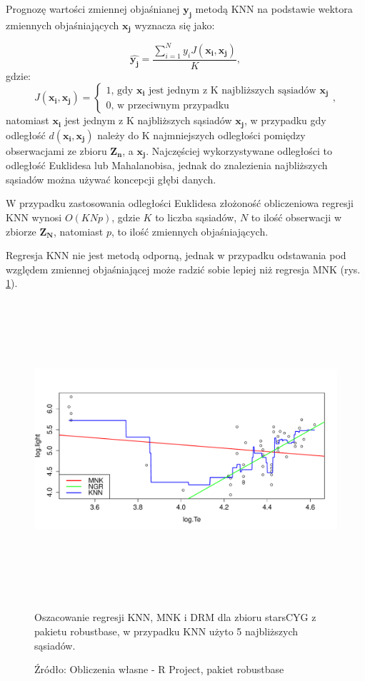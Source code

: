 \documentclass[man,mfu]{mgrwms}
\begin{document}
Prognozę wartości zmiennej objaśnianej $\mathbf{y_j}$ metodą KNN na podstawie wektora zmiennych objaśniających $\mathbf{x_j}$ wyznacza się jako:

\begin{equation}
\hat{\mathbf{y_j}} = \frac{\sum_{i=1}^N y_i J(\mathbf{x_i},\mathbf{x_j})}{K},
\end{equation}
gdzie:
\begin{equation}
J(\mathbf{x_i,x_j}) = \begin{cases} 1 \text{, gdy $\mathbf{x_i}$ jest jednym z K najbliższych sąsiadów $\mathbf{x_j}$}\\0 \text{, w przeciwnym przypadku} \end{cases},
\end{equation}
natomiast $\mathbf{x_i}$ jest jednym z K najbliższych sąsiadów $\mathbf{x_j}$, w przypadku gdy odległość $d(\mathbf{x_i,x_j})$ należy do K najmniejszych odległości pomiędzy obserwacjami ze zbioru $\mathbf{Z_n}$, a $\mathbf{x_j}$.  Najczęściej wykorzystywane odległości to odległość Euklidesa lub Mahalanobisa, jednak do znalezienia najbliższych sąsiadów można używać koncepcji głębi danych.

W przypadku zastosowania odległości Euklidesa złożoność obliczeniowa regresji KNN wynosi $O(KNp)$, gdzie $K$ to liczba sąsiadów, $N$ to ilość obserwacji w zbiorze $\mathbf{Z_N}$, natomiast $p$, to ilość zmiennych objaśniających.

Regresja KNN nie jest metodą odporną, jednak w przypadku odstawania pod względem zmiennej objaśniającej może radzić sobie lepiej niż regresja MNK (rys. \ref{starsCYG}).

\begin{figure}
\centering
\vspace{-40pt}
\includegraphics[width=140mm,height = 110mm]{knnplot}
\caption{Oszacowanie regresji KNN, MNK i DRM dla zbioru starsCYG z pakietu robustbase, w przypadku KNN użyto 5 najbliższych sąsiadów.}
\caption*{Źródło: Obliczenia własne - R Project, pakiet robustbase \cite{robustbase}}
\label{starsCYG}
\end{figure}
\end{document}
